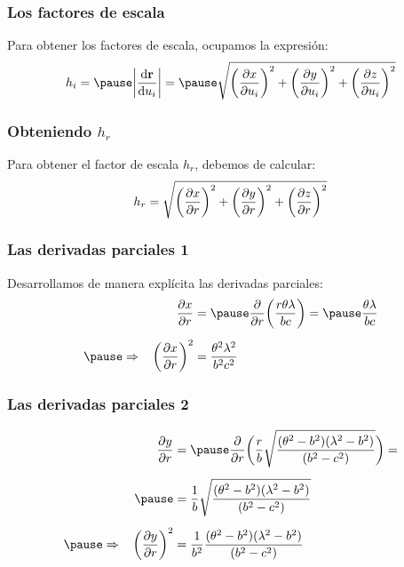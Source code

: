 \documentclass[12pt]{beamer}
\begin{document}
\begin{frame}
\frametitle{Los factores de escala}
Para obtener los factores de escala, ocupamos la expresión:
\pause
\begin{eqnarray*}
h_{i} = \pause \abs{\dv{\vb{r}}{u_{i}}} = \pause \sqrt{\bigg( \pdv{x}{u_{i}} \bigg)^{2} + \bigg( \pdv{y}{u_{i}} \bigg)^{2} + \bigg( \pdv{z}{u_{i}} \bigg)^{2}}
\end{eqnarray*}
\end{frame}
\begin{frame}
\frametitle{Obteniendo $h_{r}$}
Para obtener el factor de escala $h_{r}$, debemos de calcular:
\pause
\begin{align*}
h_{r} = \sqrt{\bigg( \pdv{x}{r} \bigg)^{2} + \bigg( \pdv{y}{r} \bigg)^{2} + \bigg( \pdv{z}{r} \bigg)^{2}}
\end{align*}
\end{frame}
\begin{frame}
\frametitle{Las derivadas parciales 1}
Desarrollamos de manera explícita las derivadas parciales:
\pause
\begin{eqnarray*}
\begin{aligned}
\pdv{x}{r} &= \pause \displaystyle \pdv{r} \bigg( \dfrac{r \theta \lambda}{b c} \bigg) = \pause \dfrac{\theta \lambda}{b c} \\[0.5em] \pause
\Rightarrow \hspace{0.3cm} \bigg( \pdv{x}{r} \bigg)^{2} &= \dfrac{\theta^{2} \lambda^{2}}{b^{2} c^{2}}
\end{aligned}
\end{eqnarray*}
\end{frame}
\begin{frame}
\frametitle{Las derivadas parciales 2}
\begin{eqnarray*}
\begin{aligned}
\pdv{y}{r} &= \pause \pdv{r} \bigg( \dfrac{r}{b} \sqrt{\dfrac{ (\theta^{2} - b^{2}) (\lambda^{2} - b^{2}) }{(b^{2} - c^{2})}} \bigg) = \\[0.5em] \pause
&= \dfrac{1}{b} \sqrt{\dfrac{ (\theta^{2} - b^{2}) (\lambda^{2} - b^{2}) }{(b^{2} - c^{2})}} \\[0.5em] \pause
\Rightarrow \hspace{0.3cm} \bigg( \pdv{y}{r} \bigg)^{2} &= \dfrac{1}{b^{2}} \dfrac{ (\theta^{2} - b^{2}) (\lambda^{2} - b^{2})}{(b^{2} - c^{2})}
\end{aligned}
\end{eqnarray*}
\end{frame}
\end{document}
